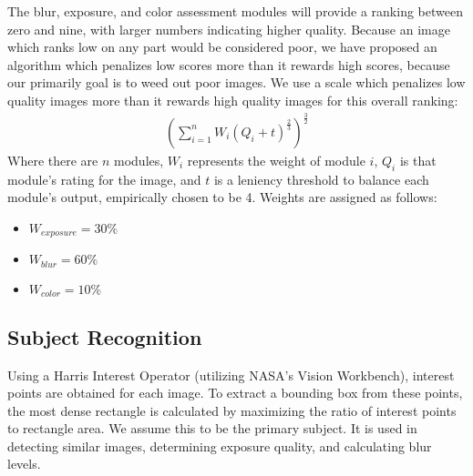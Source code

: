 \documentclass{article}
\begin{document}
The blur, exposure, and color assessment modules will provide a ranking between zero and nine, with larger numbers indicating higher quality. Because an image which ranks low on any part would be considered poor, we have proposed an algorithm which penalizes low scores more than it rewards high scores, because our primarily goal is to weed out poor images. We use a scale which penalizes low quality images more than it rewards high quality images for this overall ranking:
\begin{eqnarray}
\left(\displaystyle\sum\limits_{i=1}^nW_i\left({Q_i+t}\right)^\frac{2}{3}\right)^\frac{3}{2}
\end{eqnarray}
Where there are \(n\) modules, \(W_i\) represents the weight of module \(i\), \(Q_i\) is that module's rating for the image, and \(t\) is a leniency threshold to balance each module's output, empirically chosen to be 4. Weights are assigned as follows:
\begin{itemize}
\item \(W_{exposure}=30\%\)
\item \(W_{blur}=60\%\)
\item \(W_{color}=10\%\)
\end{itemize}

\subsection{Subject Recognition}\label{ContentRecognition}
Using a Harris Interest Operator (utilizing NASA's Vision Workbench\cite{vision-workbench}), interest points are obtained for each image. To extract a bounding box from these points, the most dense rectangle is calculated by maximizing the ratio of interest points to rectangle area. We assume this to be the primary subject. It is used in detecting similar images, determining exposure quality, and calculating blur levels. 
\end{document}
